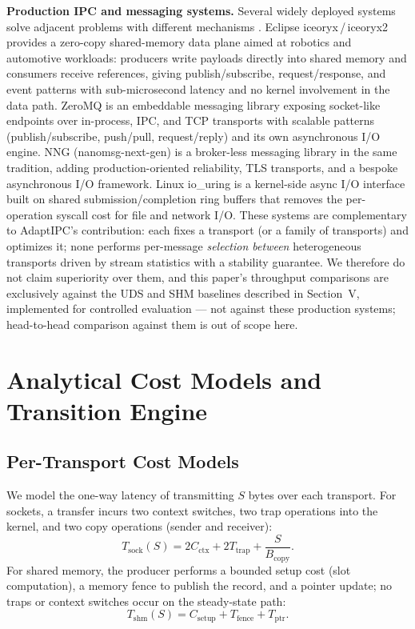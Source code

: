 \documentclass[conference]{IEEEtran}
\begin{document}
\textbf{Production IPC and messaging systems.} Several widely deployed
systems solve adjacent problems with different mechanisms
\cite{iceoryx,zeromq,nng,iouring}. Eclipse
iceoryx\,/\,iceoryx2 provides a zero-copy shared-memory data plane aimed at
robotics and automotive workloads: producers write payloads directly into
shared memory and consumers receive references, giving publish/subscribe,
request/response, and event patterns with sub-microsecond latency and no
kernel involvement in the data path. ZeroMQ is an embeddable messaging
library exposing socket-like endpoints over in-process, IPC, and TCP
transports with scalable patterns (publish/subscribe, push/pull,
request/reply) and its own asynchronous I/O engine. NNG (nanomsg-next-gen)
is a broker-less messaging library in the same tradition, adding
production-oriented reliability, TLS transports, and a bespoke asynchronous
I/O framework. Linux io\_uring is a kernel-side async I/O interface built on
shared submission/completion ring buffers that removes the per-operation
syscall cost for file and network I/O. These systems are complementary to
AdaptIPC's contribution: each fixes a transport (or a family of transports)
and optimizes it; none performs per-message \emph{selection between}
heterogeneous transports driven by stream statistics with a stability
guarantee. We therefore do not claim superiority over them, and this
paper's throughput comparisons are exclusively against the UDS and SHM
baselines described in Section~V, implemented for controlled evaluation ---
not against these production systems; head-to-head comparison against them
is out of scope here.

\section{Analytical Cost Models and Transition Engine}
\subsection{Per-Transport Cost Models}
We model the one-way latency of transmitting $S$ bytes over each transport.
For sockets, a transfer incurs two context switches, two trap operations into
the kernel, and two copy operations (sender and receiver):
\begin{equation}
T_{\mathrm{sock}}(S) = 2C_{\mathrm{ctx}} + 2T_{\mathrm{trap}}
+ \frac{S}{B_{\mathrm{copy}}}.
\label{eq:sock}
\end{equation}
For shared memory, the producer performs a bounded setup cost (slot
computation), a memory fence to publish the record, and a pointer update; no
traps or context switches occur on the steady-state path:
\begin{equation}
T_{\mathrm{shm}}(S) = C_{\mathrm{setup}} + T_{\mathrm{fence}} +
T_{\mathrm{ptr}}.
\label{eq:shm}
\end{equation}
\end{document}
